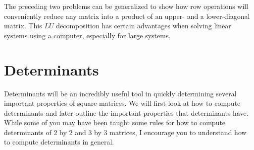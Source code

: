The preceding two problems can be generalized to show how row operations will conveniently reduce any matrix into a product of an upper- and a lower-diagonal matrix. This $LU$ decomposition has certain advantages when solving linear systems using a computer, especially for large systems.

\section{Determinants}
Determinants will be an incredibly useful tool in quickly determining several important properties of square matrices. We will first look at how to compute determinants and later outline the important properties that determinants have. While some of you may have been taught some rules for how to compute determinants of 2 by 2 and 3 by 3 matrices, I encourage you to understand how to compute determinants in general.
